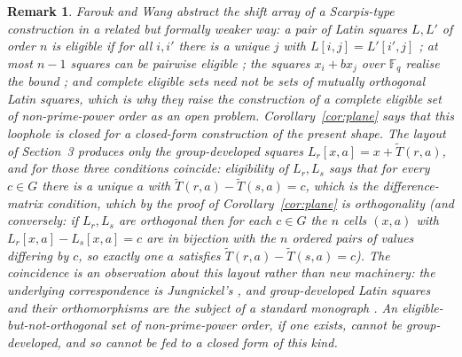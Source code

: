 \documentclass[11pt]{article}
\newtheorem{remark}{Remark}
\newcommand{\F}{\mathbb F}
\begin{document}
\begin{remark}\label{rem:lsesc}
Farouk and Wang \cite{FaroukWang2022} abstract the shift array of a
Scarpis-type construction in a related but formally weaker way: a pair of
Latin squares \(L,L'\) of order \(n\) is \emph{eligible} if for all \(i,i'\)
there is a unique \(j\) with \(L[i,j]=L'[i',j]\) \cite[Def.~2.2]{FaroukWang2022};
at most \(n-1\) squares can be pairwise eligible \cite[Thm.~2.4]{FaroukWang2022};
the squares \(x_i+bx_j\) over \(\F_q\) realise the bound
\cite[Cor.~2.5]{FaroukWang2022}; and complete eligible sets need not be sets
of mutually orthogonal Latin squares, which is why they raise the
construction of a complete eligible set of non-prime-power order as an open
problem.  Corollary~\ref{cor:plane} says that this loophole is closed for a
closed-form construction of the present shape.  The layout of Section~3 produces
only the group-developed squares \(L_r[x,a]=x+\widetilde T(r,a)\), and for
those three conditions coincide: eligibility of \(L_r,L_s\) says that for
every \(c\in G\) there is a unique \(a\) with
\(\widetilde T(r,a)-\widetilde T(s,a)=c\), which is the difference-matrix
condition, which by the proof of Corollary~\ref{cor:plane} is orthogonality
(and conversely: if \(L_r,L_s\) are orthogonal then for each \(c\in G\) the
\(n\) cells \((x,a)\) with \(L_r[x,a]-L_s[x,a]=c\) are in bijection with the
\(n\) ordered pairs of values differing by \(c\), so exactly one \(a\)
satisfies \(\widetilde T(r,a)-\widetilde T(s,a)=c\)).
The coincidence is an observation about this layout rather than new
machinery: the underlying correspondence is Jungnickel's
\cite[Thm.~1]{Jungnickel1980}, and group-developed Latin squares and their
orthomorphisms are the subject of a standard monograph \cite{Evans2018}.
An eligible-but-not-orthogonal set of non-prime-power order, if one exists,
cannot be group-developed, and so cannot be fed to a closed form of this kind.
\end{remark}
\end{document}
